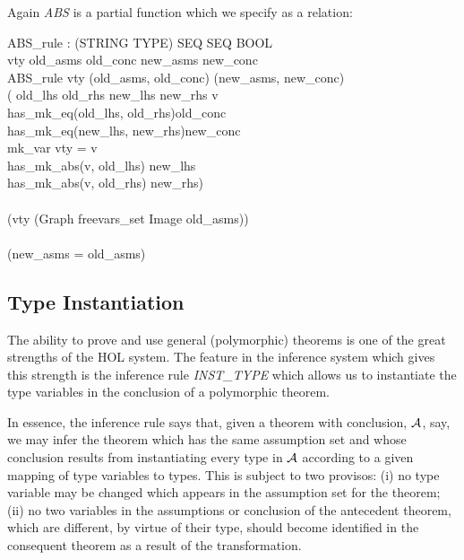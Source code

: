 \documentclass[a4paper,11pt,titlepage]{article}
\begin{document}
\begin{titlepage}
Again {\it ABS} is a partial function which we
specify as a relation:

\begin{HOLConst}
\+	\PrNL{}ABS\_rule\PrNN{} : (STRING \MMM{\times} TYPE) \MMM{\rightarrow} SEQ \MMM{\rightarrow} SEQ \MMM{\rightarrow} BOOL\\
\PrPH{}
\+	\MMM{\forall} vty old\_asms old\_conc new\_asms new\_conc \MMM{\bullet}\\
\+	ABS\_rule vty (old\_asms, old\_conc) (new\_asms, new\_conc) \MMM{\Leftrightarrow}\\
\+	(\MMM{\exists} old\_lhs old\_rhs new\_lhs new\_rhs v\MMM{\bullet}\\
\+		has\_mk\_eq(old\_lhs, old\_rhs)old\_conc \MMM{\land}\\
\+		has\_mk\_eq(new\_lhs, new\_rhs)new\_conc \MMM{\land}\\
\+		mk\_var vty = v \MMM{\land}\\
\+		has\_mk\_abs(v, old\_lhs) new\_lhs \MMM{\land}\\
\+		has\_mk\_abs(v, old\_rhs) new\_rhs)\\
\+	\MMM{\land}\\
\+	(\MMM{\lnot}vty \MMM{\in} \MMM{\bigcup}(Graph freevars\_set Image old\_asms))\\
\+	\MMM{\land}\\
\+	(new\_asms = old\_asms)\\
\end{HOLConst}



\subsection{Type Instantiation}

The ability to prove and use general (polymorphic)
theorems  is one of the great strengths of the HOL
system. The feature in the inference system which
gives this strength is the inference rule {\it INST\_TYPE}
which allows us to instantiate the type variables
in the conclusion of a polymorphic theorem.

In essence, the inference rule says that, given a theorem
with conclusion, $\cal A$, say, we may infer the theorem
which has the same assumption set and whose conclusion
results from instantiating every type in $\cal A$
according to a given mapping of type variables to types.
This is subject to two provisos: (i) no type variable may
be changed which appears in the assumption set for the
theorem; (ii) no two variables in the assumptions or
conclusion of the antecedent theorem, which are
different, by virtue of their type,  should become
identified in the consequent theorem as a result of
the transformation.


\end{titlepage}
\end{document}
